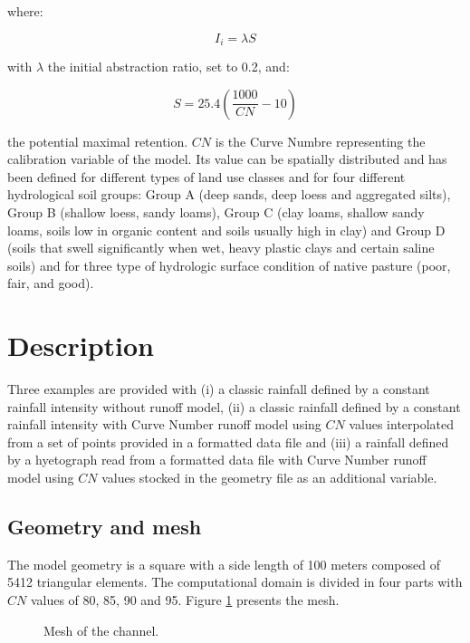 where:

\begin{equation}
  I_i=\lambda S
\end{equation}

with $\lambda$ the initial abstraction ratio, set to 0.2, and:

\begin{equation}
  S=25.4\left(\frac{1000}{CN}-10\right)
\end{equation}

the potential maximal retention. $CN$ is the Curve Numbre representing the calibration variable of the model. Its value can be spatially distributed and has been defined for different types of land use classes and for four different hydrological soil groups: Group A (deep sands, deep loess and aggregated silts), Group B (shallow loess, sandy loams), Group C (clay loams, shallow sandy loams, soils low in organic content and soils usually high in clay) and Group D (soils that swell significantly when wet, heavy plastic clays and certain saline soils) and for three type of hydrologic surface condition of native pasture (poor, fair, and good).

\section{Description}

Three examples are provided with (i) a classic rainfall defined by a constant rainfall intensity without runoff model, (ii) a classic rainfall defined by a constant rainfall intensity with Curve Number runoff model using $CN$ values interpolated from a set of points provided in a formatted data file and (iii) a rainfall defined by a hyetograph read from a formatted data file with Curve Number runoff model using $CN$ values stocked in the geometry file as an additional variable.

\subsection{Geometry and mesh}

The model geometry is a square with a side length of 100 meters composed of 5412 triangular elements. The computational domain is divided in four parts with $CN$ values of 80, 85, 90 and 95. Figure \ref{pluie:fig:mesh} presents the mesh.

\begin{figure}[!htbp]
 \centering
 \caption{Mesh of the channel.}
 \label{pluie:fig:mesh}
\end{figure}

